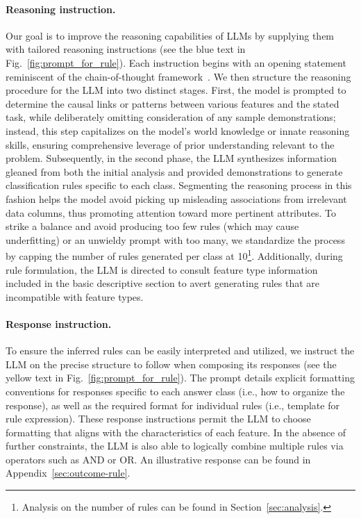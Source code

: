 \paragraph{Reasoning instruction.} Our goal is to improve the reasoning capabilities of LLMs by supplying them with tailored reasoning instructions (see the blue text in Fig.~\ref{fig:prompt_for_rule}). Each instruction begins with an opening statement reminiscent of the chain-of-thought framework~\cite{wei2022chain}. We then structure the reasoning procedure for the LLM into two distinct stages. First, the model is prompted to determine the causal links or patterns between various features and the stated task, while deliberately omitting consideration of any sample demonstrations; instead, this step capitalizes on the model’s world knowledge or innate reasoning skills, ensuring comprehensive leverage of prior understanding relevant to the problem. Subsequently, in the second phase, the LLM synthesizes information gleaned from both the initial analysis and provided demonstrations to generate classification rules specific to each class. Segmenting the reasoning process in this fashion helps the model avoid picking up misleading associations from irrelevant data columns, thus promoting attention toward more pertinent attributes. To strike a balance and avoid producing too few rules (which may cause underfitting) or an unwieldy prompt with too many, we standardize the process by capping the number of rules generated per class at 10\footnote{Analysis on the number of rules can be found in Section~\ref{sec:analysis}.}. Additionally, during rule formulation, the LLM is directed to consult feature type information included in the basic descriptive section to avert generating rules that are incompatible with feature types.

\vspace*{-0.12in}
\paragraph{Response instruction.} To ensure the inferred rules can be easily interpreted and utilized, we instruct the LLM on the precise structure to follow when composing its responses (see the yellow text in Fig.~\ref{fig:prompt_for_rule}). The prompt details explicit formatting conventions for responses specific to each answer class (i.e., how to organize the response), as well as the required format for individual rules (i.e., template for rule expression). These response instructions permit the LLM to choose formatting that aligns with the characteristics of each feature. In the absence of further constraints, the LLM is also able to logically combine multiple rules via operators such as AND or OR. An illustrative response can be found in Appendix~\ref{sec:outcome-rule}.

